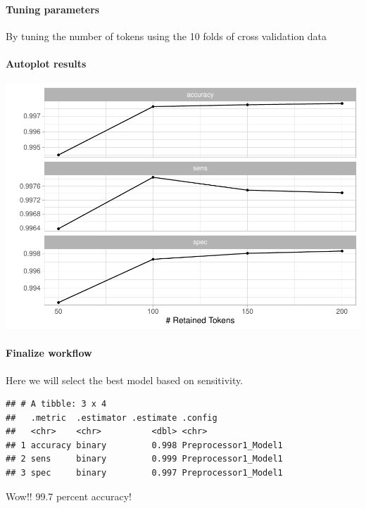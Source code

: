 \documentclass[fleqn,10pt,lineno]{wlpeerj} %
\begin{document}
\hypertarget{tuning-parameters}{%
\paragraph{Tuning parameters}\label{tuning-parameters}}

By tuning the number of tokens using the 10 folds of cross validation data

\hypertarget{autoplot-results}{%
\paragraph{Autoplot results}\label{autoplot-results}}

\includegraphics{spanish-flu-mortality_bookdown_files/figure-latex/unnamed-chunk-35-1.pdf}

\hypertarget{finalize-workflow}{%
\paragraph{Finalize workflow}\label{finalize-workflow}}

Here we will select the best model based on sensitivity.

\begin{verbatim}
## # A tibble: 3 x 4
##   .metric  .estimator .estimate .config             
##   <chr>    <chr>          <dbl> <chr>               
## 1 accuracy binary         0.998 Preprocessor1_Model1
## 2 sens     binary         0.999 Preprocessor1_Model1
## 3 spec     binary         0.997 Preprocessor1_Model1
\end{verbatim}

Wow!! 99.7 percent accuracy!
\end{document}
